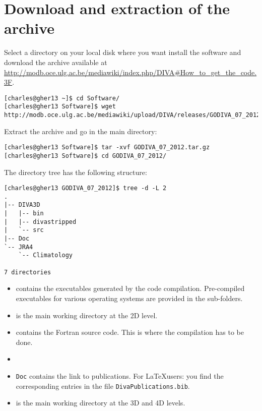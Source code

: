 \section{Download and extraction of the archive}

Select a directory on your local disk where you want install the software and download the archive available at \url{http://modb.oce.ulg.ac.be/mediawiki/index.php/DIVA#How_to_get_the_code.3F}.

\begin{lstlisting}[style=Bash]
[charles@gher13 ~]$ cd Software/
[charles@gher13 Software]$ wget http://modb.oce.ulg.ac.be/mediawiki/upload/DIVA/releases/GODIVA_07_2012.tar.gz
\end{lstlisting}

Extract the archive and go in the main directory:
\begin{lstlisting}[style=Bash]
[charles@gher13 Software]$ tar -xvf GODIVA_07_2012.tar.gz
[charles@gher13 Software]$ cd GODIVA_07_2012/
\end{lstlisting}

The directory tree has the following structure: %
\begin{lstlisting}[style=Bash]
[charles@gher13 GODIVA_07_2012]$ tree -d -L 2
.
|-- DIVA3D
|   |-- bin
|   |-- divastripped
|   `-- src
|-- Doc
`-- JRA4
    `-- Climatology

7 directories
\end{lstlisting}


\begin{itemize}
\item {} contains the executables generated by the code compilation. Pre-compiled executables for various operating systems are provided in the sub-folders.
\item {} is the main working directory at the 2D level. 
\item {} contains the Fortran source code. This is where the compilation has to be done.
\item[]
\item \texttt{Doc} contains the link to publications. For \LaTeX users: you find the corresponding \BibTeX entries in the file \texttt{DivaPublications.bib}.
\item {} is the main working directory at the 3D and 4D levels.
\end{itemize}

